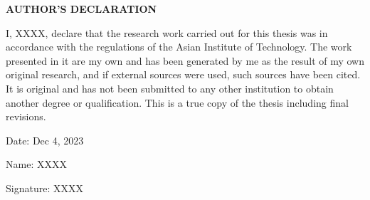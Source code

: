 {}
\begin{center}
    \large{\bf AUTHOR'S DECLARATION}
\end{center}

I, XXXX, declare that the research work carried out for this thesis was in accordance with the regulations of the Asian Institute of Technology. The work presented in it are my own and has been generated by me as the result of my own original research, and if external sources were used, such sources have been cited. It is original and has not been submitted to any other institution to obtain another degree or qualification. This is a true copy of the thesis including final revisions.

Date: Dec 4, 2023

Name: XXXX


Signature: XXXX

